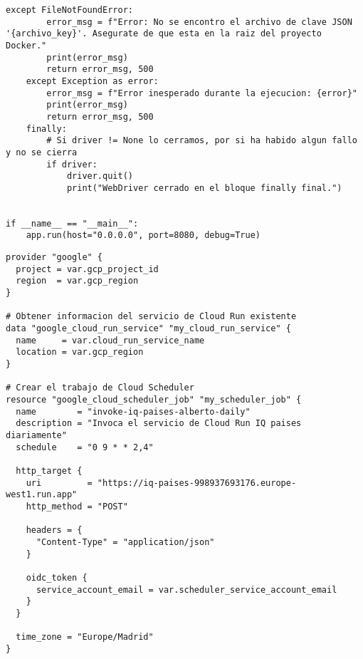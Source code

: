 \begin{lstlisting}[caption = {Código de web scrapping completo.}, label = WBSCode]
    except FileNotFoundError:
        error_msg = f"Error: No se encontro el archivo de clave JSON '{archivo_key}'. Asegurate de que esta en la raiz del proyecto Docker."
        print(error_msg)
        return error_msg, 500
    except Exception as error:
        error_msg = f"Error inesperado durante la ejecucion: {error}"
        print(error_msg)
        return error_msg, 500
    finally:
        # Si driver != None lo cerramos, por si ha habido algun fallo y no se cierra
        if driver:
            driver.quit()
            print("WebDriver cerrado en el bloque finally final.")


if __name__ == "__main__":
    app.run(host="0.0.0.0", port=8080, debug=True)
\end{lstlisting}


\begin{lstlisting}[caption = {Código de Terraform para el Google Scheduler.}, label = TFCode]
provider "google" {
  project = var.gcp_project_id
  region  = var.gcp_region
}

# Obtener informacion del servicio de Cloud Run existente
data "google_cloud_run_service" "my_cloud_run_service" {
  name     = var.cloud_run_service_name
  location = var.gcp_region
}

# Crear el trabajo de Cloud Scheduler
resource "google_cloud_scheduler_job" "my_scheduler_job" {
  name        = "invoke-iq-paises-alberto-daily"
  description = "Invoca el servicio de Cloud Run IQ paises diariamente"
  schedule    = "0 9 * * 2,4"

  http_target {
    uri         = "https://iq-paises-998937693176.europe-west1.run.app"
    http_method = "POST" 

	headers = {
      "Content-Type" = "application/json"
    }

    oidc_token {
      service_account_email = var.scheduler_service_account_email
    }
  }

  time_zone = "Europe/Madrid"
}
\end{lstlisting}